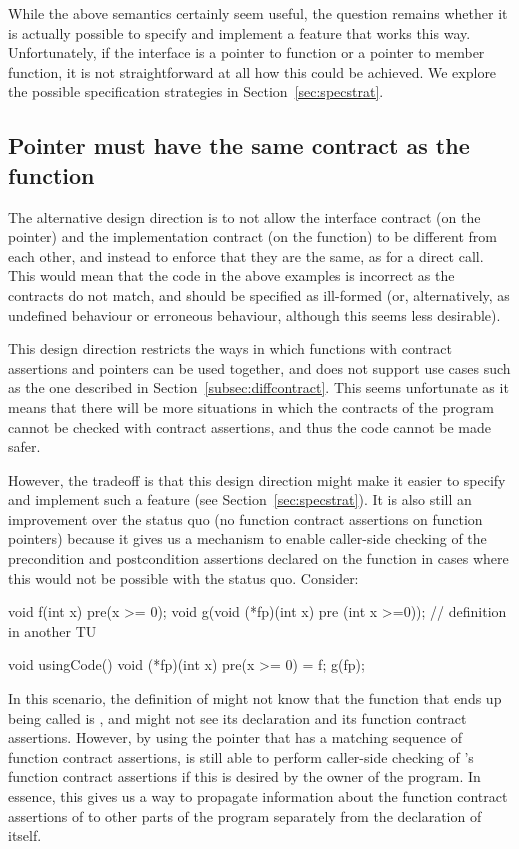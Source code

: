 While the above semantics certainly seem useful, the question remains whether it is actually possible to specify and implement a feature that works this way. Unfortunately, if the interface is a pointer to function or a pointer to member function, it is not straightforward at all how this could be achieved. We explore the possible specification strategies in Section~\ref{sec:specstrat}.

\subsection{Pointer must have the same contract as the function}
\label{subsec:samecontract}

The alternative design direction is to not allow the interface contract (on the pointer) and the implementation contract (on the function) to be different from each other, and instead to enforce that they are the same, as for a direct call. This would mean that the code in the above examples is incorrect as the contracts do not match, and should be specified as ill-formed (or, alternatively, as undefined behaviour or erroneous behaviour, although this seems less desirable).

This design direction restricts the ways in which functions with contract assertions and pointers can be used together, and does not support use cases such as the one described in Section~\ref{subsec:diffcontract}. This seems unfortunate as it means that there will be more situations in which the contracts of the program cannot be checked with contract assertions, and thus the code cannot be made safer.

However, the tradeoff is that  this design direction might make it easier to specify and implement such a feature (see Section~\ref{sec:specstrat}). It is also still an improvement over the status quo (no function contract assertions on function pointers) because it gives us a mechanism to enable caller-side checking of the precondition and postcondition assertions declared on the function in cases where this would not be possible with the status quo. Consider:
\begin{codeblock}
void f(int x) pre(x >= 0);
void g(void (*fp)(int x) pre (int x >=0)); // definition in another TU

void usingCode() {
   void (*fp)(int x) pre(x >= 0) = f;
   g(fp);
}
\end{codeblock}
In this scenario, the definition of  might not know that the function that ends up being called is , and might not see its declaration and its function contract assertions. However, by using the pointer  that has a matching sequence of function contract assertions,  is still able to perform caller-side checking of 's function contract assertions if this is desired by the owner of the program. In essence, this gives us a way to propagate information about the function contract assertions of  to other parts of the program separately from the declaration of  itself.


